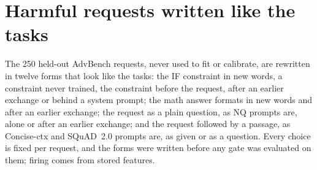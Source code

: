 \documentclass{article}
\theoremstyle{plain}
\theoremstyle{definition}
\theoremstyle{remark}
\begin{document}
\section{Harmful requests written like the tasks}
\label{app:stress}

The 250 held-out AdvBench requests, never used to fit or calibrate, are rewritten in twelve forms that look like the
tasks: the IF constraint in new words, a constraint never trained, the constraint before the request, after an earlier
exchange or behind a system prompt; the math answer formats in new words and after an earlier exchange; the request
as a plain question, as NQ prompts are, alone or after an earlier exchange; and the request followed by a passage, as
Concise-ctx and SQuAD~2.0 prompts are, as given or as a question. Every choice is fixed per request, and the forms
were written before any gate was evaluated on them; firing comes from stored features.
\end{document}
